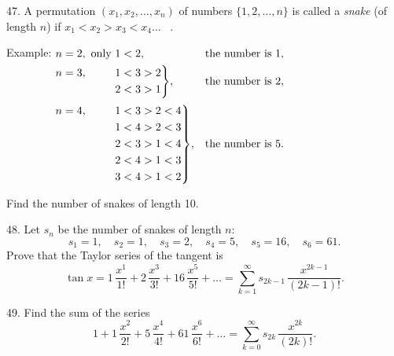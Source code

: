 \begin{problem}{47.}
	A permutation $(x_1,x_2, \dots,x_n)$ of numbers $\{1, 2, \dots, n\}$ is called a 
    \emph{snake} (of length $n$) if $x_1<x_2>x_3<x_4 \dots$ \  .
    \medskip

	\begin{note}{Example:}
		$\begin{aligned}[t]
		&\begin{aligned}[t] n=2, \text{ only }  1<2, \end{aligned} &&\text{the number is  }1, \\
		&\hskip-\nulldelimiterspace\mathord{\left.\begin{aligned} n=3, \hphantom{\text{ only }} 1&<3>2 \\ 
				                                      2&<3>1\end{aligned} \right\}}, && \text{the number is  }2,  \\[2pt]
		&\hskip-\nulldelimiterspace\mathord{\left.\begin{aligned} n=4, \hphantom{\text{ only }} 1&<3>2<4 \\ 
				                                      1&<4>2<3 \\ 
				                            2&<3>1<4 \\ 
				                            2&<4>1<3 \\ 
				                            3&<4>1<2\end{aligned} \right\}},
				                            &&\text{the number is  }5. \\
		\end{aligned}$
	\end{note}
	Find the number of snakes of length 10.
\end{problem}

\begin{problem}{48.}
	Let $s_n$ be the number of snakes of length $n$:
	$$
	s_1=1, \quad s_2=1, \quad s_3=2, \quad s_4=5, \quad s_5=16, \quad s_6=61.
	$$
	Prove that the Taylor series of the tangent is
	$$
	\tan x=1\, \frac{x^1}{1!}+2\, \frac{x^3}{3!}+16\, \frac{x^5}{5!}+\dots=
	\textstyle\sum\limits_{k=1}^{\infty} s_{2k-1}\, \frac{x^{2k-1}}{(2k-1)!}.
	$$
\end{problem}

\begin{problem}{49.}
	Find the sum of the series
	$$
	1+1\, \frac{x^2}{2!}+5\, \frac{x^4}{4!}+61\, \frac{x^6}{6!}+\dots=
	\textstyle\sum\limits_{k=0}^{\infty} s_{2k}\,\frac{x^{2k}}{(2k)!}.
	$$
\end{problem}

